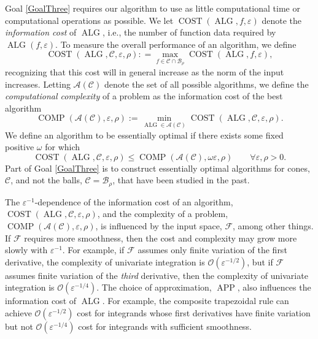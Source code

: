 \documentclass[11pt]{NSFamsart}
\DeclareMathOperator{\cost}{COST}
\DeclareMathOperator{\comp}{COMP}
\DeclareMathOperator{\APP}{APP}
\DeclareMathOperator{\ALG}{ALG}
\newcommand{\cc}{\mathcal{C}}
\newcommand{\cb}{\mathcal{B}}
\newcommand{\cala}{{\mathcal{A}}}
\newcommand{\calc}{{\mathcal{C}}}
\newcommand{\calf}{{\mathcal{F}}}
\newcommand{\Order}{\mathcal{O}}
\begin{document}
Goal \ref{GoalThree} requires our algorithm to use as little computational time or computational operations as possible.  We let $\cost(\ALG, f,\varepsilon)$ denote the \emph{information cost} of $\ALG$, i.e., the number of function data required by $\ALG(f,\varepsilon)$. To measure the overall performance of an algorithm, we define 
\begin{equation}
    \cost(\ALG, \calc, \varepsilon,\rho) : = \max_{f \in \calc \cap \cb_{\rho}} \cost(\ALG,f,\varepsilon),
\end{equation}
recognizing that this cost will in general increase as the norm of the input increases. Letting $\cala(\cc)$ denote the set of all possible algorithms, we define the \emph{computational complexity} of a problem as the information cost of the best algorithm
\begin{equation}
    \comp(\cala(\cc), \varepsilon,\rho) := \min_{\ALG \in \cala(\cc)} \cost(\ALG, \calc, \varepsilon,\rho) .
\end{equation}
We define an algorithm to be essentially optimal if there exists some fixed positive $\omega$ for which
\begin{equation}
    \cost(\ALG, \calc, \varepsilon,\rho) \le \comp(\cala(\cc), \omega \varepsilon,\rho) \qquad \forall \varepsilon,\rho > 0.
\end{equation}
Part of Goal \ref{GoalThree} is to construct essentially optimal algorithms for cones, $\calc$, and not the balls, $\calc = \cb_{\rho}$, that have been studied in the past.

The $\varepsilon^{-1}$-dependence of the information cost of an algorithm, $\cost(\ALG, \calc, \varepsilon,\rho)$, and the complexity of a problem,  $\comp(\cala(\cc), \varepsilon,\rho)$, is influenced by the input space, $\calf$, among other things.  If $\calf$ requires more smoothness, then the cost and complexity may grow more slowly with $\varepsilon^{-1}$.  For example, if $\calf$  assumes only finite variation of the first derivative, the complexity of univariate integration is $\Order(\varepsilon^{-1/2})$, but if $\calf$ assumes finite variation of the \emph{third} derivative, then the complexity of univariate integration is $\Order(\varepsilon^{-1/4})$.  The choice of approximation, $\APP$, also influences the information cost of $\ALG$.  For example, the composite trapezoidal rule can achieve $\Order(\varepsilon^{-1/2})$ cost for integrands whose first derivatives have finite variation but not $\Order(\varepsilon^{-1/4})$ cost for integrands with sufficient smoothness.
\end{document}
